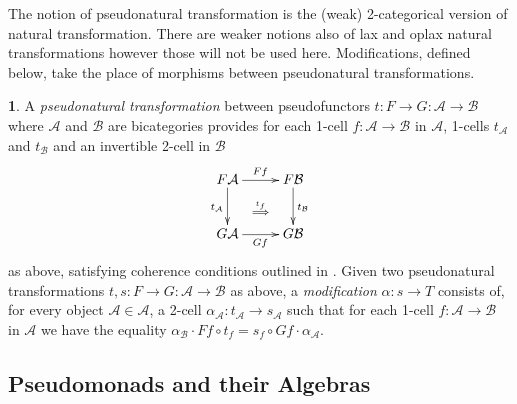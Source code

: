 \documentclass[a4paper,oneside,english]{amsart}
\numberwithin{equation}{section}
\numberwithin{figure}{section}
\theoremstyle{plain}
\theoremstyle{definition}
\newtheorem{defn}[thm]{\protect\definitionname}
\theoremstyle{remark}
\theoremstyle{definition}
\theoremstyle{plain}
\theoremstyle{plain}
\theoremstyle{plain}
\providecommand{\definitionname}{Definition}
\begin{document}
The notion of pseudonatural transformation is the (weak) 2-categorical
version of natural transformation. There are weaker notions also of
lax and oplax natural transformations however those will not be used
here. Modifications, defined below, take the place of morphisms between
pseudonatural transformations.
\begin{defn}
A \emph{pseudonatural transformation} between pseudofunctors $t\colon F\to G\colon\mathscr{A}\to\mathscr{B}$
where $\mathscr{A}$ and $\mathscr{B}$ are bicategories provides
for each 1-cell $f\colon\mathcal{A}\to\mathcal{B}$ in $\mathscr{A}$,
1-cells $t_{\mathcal{A}}$ and $t_{\mathcal{B}}$ and an invertible
2-cell in $\mathscr{B}$ 
\[
\xymatrix@=1em{F\mathcal{A}\ar[rr]^{Ff}\ar[dd]_{t_{\mathcal{A}}} &  & F\mathcal{B}\ar[dd]^{t_{\mathcal{B}}}\\
 & \ar@{}[]|-{\overset{t_{f}}{\implies}}\\
G\mathcal{A}\ar[rr]_{Gf} &  & G\mathcal{B}
}
\]
as above, satisfying coherence conditions outlined in \cite[Definition 2.2]{kelly1974}.
Given two pseudonatural transformations $t,s\colon F\to G\colon\mathscr{A}\to\mathscr{B}$
as above, a \emph{modification} $\alpha\colon s\to T$ consists of,
for every object $\mathcal{A}\in\mathscr{A}$, a 2-cell $\alpha_{\mathcal{A}}\colon t_{\mathcal{A}}\to s_{\mathcal{A}}$
such that for each 1-cell $f\colon\mathcal{A}\to\mathcal{B}$ in $\mathscr{A}$
we have the equality $\alpha_{\mathcal{B}}\cdot Ff\circ t_{f}=s_{f}\circ Gf\cdot\alpha_{\mathcal{A}}$.
\end{defn}

\subsection{Pseudomonads and their Algebras}
\end{document}
